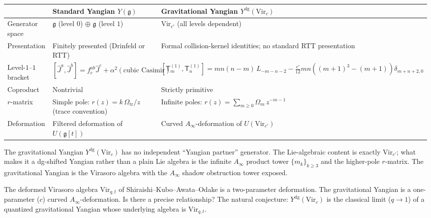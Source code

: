 \documentclass[11pt]{article}
\newcommand{\fg}{\mathfrak{g}}
\begin{document}
\begin{center}
\renewcommand{\arraystretch}{1.4}
\small
\begin{tabular}{@{}p{3.2cm}p{5.4cm}p{5.4cm}@{}}
\toprule
& \textbf{Standard Yangian $Y(\fg)$}
& \textbf{Gravitational Yangian $Y^{\mathrm{dg}}(\mathrm{Vir}_c)$}
\\
\midrule
Generator space
& $\fg$ (level $0$) $\oplus$ $\fg$ (level $1$)
& $\mathrm{Vir}_{c'}$ (all levels dependent)
\\
Presentation
& Finitely presented (Drinfeld or RTT)
& Formal collision-kernel identities; no standard RTT presentation
\\
Level-$1$--$1$ bracket
& $[\hat{J}^a, \hat{J}^b] = f^{ab}_c\hat{J}^c
  + \alpha^2(\text{cubic Casimir})$
& $[\mathsf{T}_m^{(1)}, \mathsf{T}_n^{(1)}]
  = mn(n{-}m)\,L_{-m-n-2}
  - \frac{c'}{12}mn((m{+}1)^3{-}(m{+}1))\delta_{m+n+2,0}$
\\
Coproduct
& Nontrivial
& Strictly primitive
\\
$r$-matrix
& Simple pole: $r(z) = k\,\Omega_{\mathrm{tr}}/z$ \textup{(trace convention)}
& Infinite poles: $r(z) = \sum_{m \ge 0}\Omega_m\,z^{-m-1}$
\\
Deformation
& Filtered deformation of $U(\fg[t])$
& Curved $A_\infty$-deformation of $U(\mathrm{Vir}_{c'})$
\\
\bottomrule
\end{tabular}
\end{center}

\begin{observation}
The gravitational Yangian $Y^{\mathrm{dg}}(\mathrm{Vir}_c)$ has no
independent ``Yangian partner'' generator.  The Lie-algebraic content
is exactly $\mathrm{Vir}_{c'}$; what makes it a dg-shifted Yangian
rather than a plain Lie algebra is the infinite $A_\infty$ product
tower $\{m_k\}_{k \ge 3}$ and the higher-pole $r$-matrix.  The
gravitational Yangian is the Virasoro algebra with the $A_\infty$
shadow obstruction tower exposed.
\end{observation}

\begin{question}
The deformed Virasoro algebra $\mathrm{Vir}_{q,t}$ of
Shiraishi--Kubo--Awata--Odake is a two-parameter deformation.
The gravitational Yangian is a one-parameter ($c$) curved
$A_\infty$-deformation.  Is there a precise relationship?  The
natural conjecture: $Y^{\mathrm{dg}}(\mathrm{Vir}_c)$ is the
classical limit ($q \to 1$) of a quantized gravitational Yangian
whose underlying algebra is $\mathrm{Vir}_{q,t}$.
\end{question}
\end{document}
